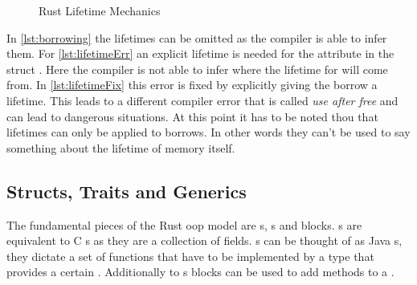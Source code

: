\documentclass[thesis]{subfiles}
\begin{document}
    \newsavebox{\lifetimeFixBox}
    \begin{lrbox}{\lifetimeFixBox}%
      \begin{minipage}{.45\linewidth}
        
      \end{minipage}
    \end{lrbox}

    \begin{figure}[ht]
      \captionsetup{type=lstlisting}
       \hfill%
      \caption{Rust Lifetime Mechanics}\label{lst:lifetime}
    \end{figure}

    In \autoref{lst:borrowing} the lifetimes can be omitted as the compiler is able to infer them.
    For \autoref{lst:lifetimeErr} an explicit lifetime is needed for the attribute  in the struct .
    Here the compiler is not able to infer where the lifetime for  will come from.
    In \autoref{lst:lifetimeFix} this error is fixed by explicitly giving the borrow a lifetime.
    This leads to a different compiler error that is called \emph{use after free} and can lead to dangerous situations.
    At this point it has to be noted thou that lifetimes can only be applied to borrows.
    In other words they can't be used to say something about the lifetime of memory itself.

  \subsection{Structs, Traits and Generics}
    The fundamental pieces of the Rust \gls{oop} model are s, s and  blocks.
    s are equivalent to C s as they are a collection of fields.
    s can be thought of as Java s, they dictate a set of functions that have to be implemented by a type that provides a certain .
    Additionally to s  blocks can be used to add methods to a .
\end{document}
